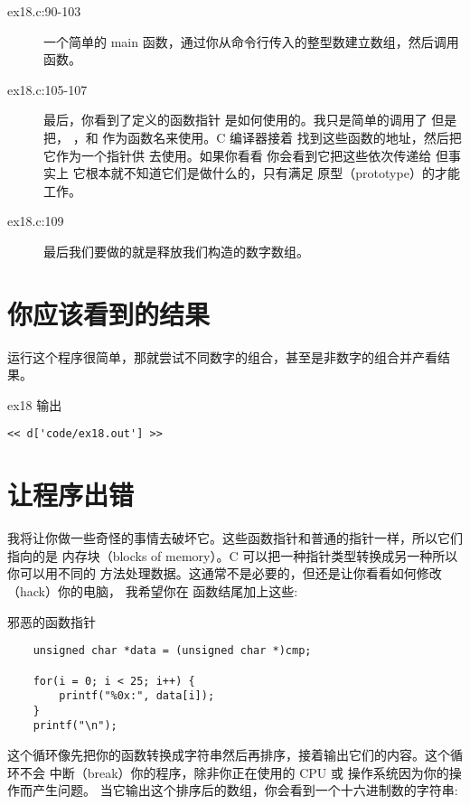 \begin{description}
\item[ex18.c:90-103] 一个简单的 main 函数，通过你从命令行传入的整型数建立数组，然后调用 
     函数。
\item[ex18.c:105-107] 最后，你看到了定义的函数指针 
    是如何使用的。我只是简单的调用了  但是把，
    ，和  作为函数名来使用。C 编译器接着
    找到这些函数的地址，然后把它作为一个指针供  去使用。如果你看看
     你会看到它把这些依次传递给 但事实上 
    它根本就不知道它们是做什么的，只有满足 原型（prototype）的才能工作。
\item[ex18.c:109] 最后我们要做的就是释放我们构造的数字数组。
\end{description}


\section{你应该看到的结果}

运行这个程序很简单，那就尝试不同数字的组合，甚至是非数字的组合并产看结果。

\begin{code}{ex18 输出}
\begin{lstlisting}
<< d['code/ex18.out'] >>
\end{lstlisting}
\end{code}


\section{让程序出错}

我将让你做一些奇怪的事情去破坏它。这些函数指针和普通的指针一样，所以它们指向的是
内存块（blocks of memory）。C 可以把一种指针类型转换成另一种所以你可以用不同的
方法处理数据。这通常不是必要的，但还是让你看看如何修改（hack）你的电脑，
我希望你在  函数结尾加上这些:

\begin{code}{邪恶的函数指针}
\begin{lstlisting}
    unsigned char *data = (unsigned char *)cmp;

    for(i = 0; i < 25; i++) {
        printf("%0x:", data[i]);
    }
    printf("\n");
\end{lstlisting}
\end{code}

这个循环像先把你的函数转换成字符串然后再排序，接着输出它们的内容。这个循环不会
中断（break）你的程序，除非你正在使用的 CPU 或 操作系统因为你的操作而产生问题。
当它输出这个排序后的数组，你会看到一个十六进制数的字符串:

